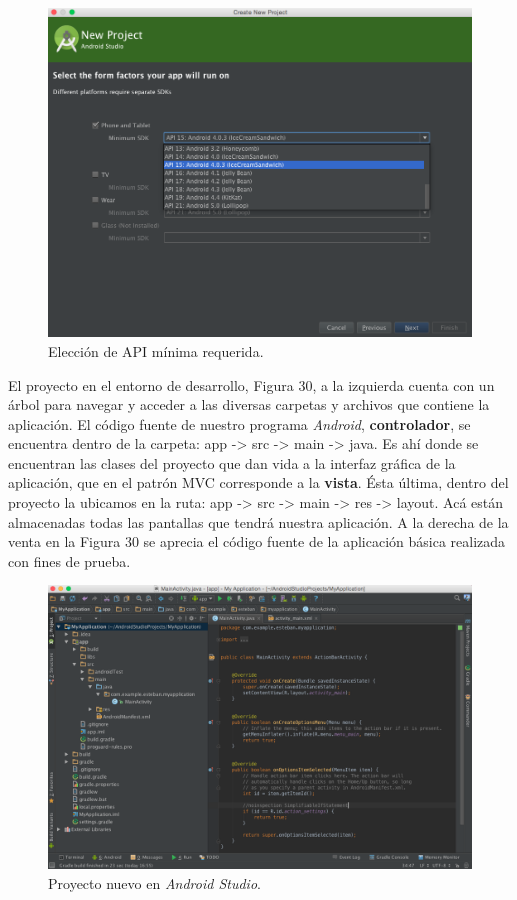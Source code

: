 \begin{figure}[H]
\centering
\includegraphics[scale=0.40]{images/capitulo5/minSDK.png}
\caption{Elección de API mínima requerida.}
\label{minSDK}
\end{figure}

El proyecto en el entorno de desarrollo, Figura 30, a la izquierda cuenta con un árbol para navegar y acceder a las diversas carpetas y archivos que contiene la aplicación. El código fuente de nuestro programa \textit{Android}, \textbf{controlador}, se encuentra dentro de la carpeta: app -> src -> main -> java. Es ahí donde se encuentran las clases del proyecto que dan vida a la interfaz gráfica de la aplicación, que en el patrón MVC corresponde a la \textbf{vista}. Ésta última, dentro del proyecto la ubicamos en la ruta: app -> src -> main -> res -> layout. Acá están almacenadas todas las pantallas que tendrá nuestra aplicación. A la derecha de la venta en la Figura 30 se aprecia el código fuente de la aplicación básica realizada con fines de prueba.\\

\begin{figure}[H]
\centering
\includegraphics[scale=0.40]{images/capitulo5/proyectoAndroid.png}
\caption{Proyecto nuevo en \textit{Android Studio}.}
\label{proyectoAndroid}
\end{figure}

